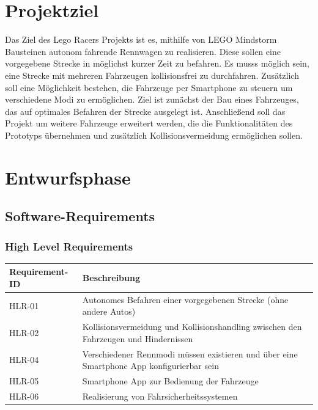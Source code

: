 \documentclass[a4paper,12pt]{article}                                         %
\def\myType{0}
\numberwithin{table}{section}                               %
\numberwithin{figure}{section}                              %
\begin{document}
	\ifcase\myType
		
	\or
		
	\or
		
	\else
	\fi
	
	\pagestyle{fancy}
	
	
	

	\pagestyle{fancy}
	\fancyhead[L]{\nouppercase{\leftmark}}
		
	
	\section{Projektziel}
	Das Ziel des Lego Racers Projekts ist es, mithilfe von LEGO Mindstorm Bausteinen autonom fahrende Rennwagen zu realisieren. Diese sollen eine vorgegebene Strecke in möglichst kurzer Zeit zu befahren. Es musss möglich sein, eine Strecke mit mehreren Fahrzeugen kollisionsfrei zu durchfahren. Zusätzlich soll eine Möglichkeit bestehen, die Fahrzeuge per Smartphone zu steuern um verschiedene Modi zu ermöglichen. Ziel ist zunächst der Bau eines Fahrzeuges, das auf optimales Befahren der Strecke ausgelegt ist. Anschließend soll das Projekt um weitere Fahrzeuge erweitert werden, die die Funktionalitäten des Prototyps übernehmen und zusätzlich Kollisionsvermeidung ermöglichen sollen.
	
	\newpage
	
	\section{Entwurfsphase}
	\subsection{Software-Requirements}
	\subsubsection{High Level Requirements}
	
	\begin{tabular}{ l | p{} }
	\textbf{Requirement-ID} & \textbf{Beschreibung} \\ \hline
	HLR-01 & 
	Autonomes Befahren einer vorgegebenen Strecke (ohne andere Autos)
	\\
	HLR-02 &
	Kollisionsvermeidung und Kollisionshandling zwischen den Fahrzeugen und Hindernissen \\
	HLR-04 &
	Verschiedener Rennmodi müssen existieren und über eine Smartphone App konfigurierbar sein \\	
	HLR-05 &
	Smartphone App zur Bedienung der Fahrzeuge\\
	HLR-06 &
	Realisierung von Fahrsicherheitssystemen\\
	\end{tabular}
    
\end{document}
